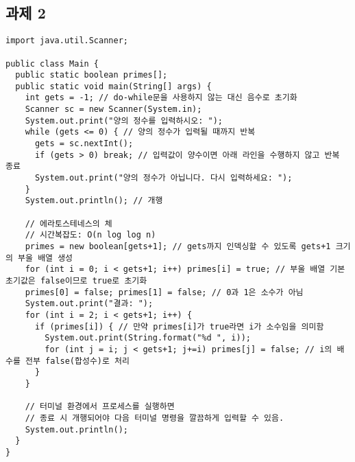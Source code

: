 \documentclass{article}
\begin{document}
\subsection{과제 2}
\begin{lstlisting}
import java.util.Scanner;

public class Main {
  public static boolean primes[];
  public static void main(String[] args) {
    int gets = -1; // do-while문을 사용하지 않는 대신 음수로 초기화
    Scanner sc = new Scanner(System.in);
    System.out.print("양의 정수를 입력하시오: ");
    while (gets <= 0) { // 양의 정수가 입력될 때까지 반복
      gets = sc.nextInt();
      if (gets > 0) break; // 입력값이 양수이면 아래 라인을 수행하지 않고 반복 종료
      System.out.print("양의 정수가 아닙니다. 다시 입력하세요: ");
    }
    System.out.println(); // 개행

    // 에라토스테네스의 체
    // 시간복잡도: O(n log log n)
    primes = new boolean[gets+1]; // gets까지 인덱싱할 수 있도록 gets+1 크기의 부울 배열 생성
    for (int i = 0; i < gets+1; i++) primes[i] = true; // 부울 배열 기본 초기값은 false이므로 true로 초기화
    primes[0] = false; primes[1] = false; // 0과 1은 소수가 아님
    System.out.print("결과: ");
    for (int i = 2; i < gets+1; i++) {
      if (primes[i]) { // 만약 primes[i]가 true라면 i가 소수임을 의미함
        System.out.print(String.format("%d ", i));
        for (int j = i; j < gets+1; j+=i) primes[j] = false; // i의 배수를 전부 false(합성수)로 처리
      }
    }

    // 터미널 환경에서 프로세스를 실행하면
    // 종료 시 개행되어야 다음 터미널 명령을 깔끔하게 입력할 수 있음.
    System.out.println();
  }
}
\end{lstlisting}
\end{document}
